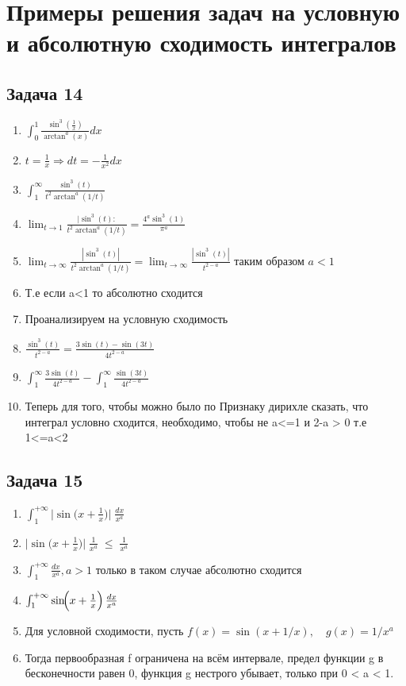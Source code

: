 \documentclass[a4paper,12pt]{article}
\begin{document}
\section{Примеры решения задач на условную и абсолютную сходимость интегралов}

\subsection{Задача 14}

\begin{enumerate}
    \item $\int_{0}^{1}\frac{\sin^3(\frac{1}{x})}{\arctan^a(x)}dx$
    \item $t = \frac{1}{x} \Rightarrow dt = -\frac{1}{x^2}dx$
    \item $\int_{1}^{\infty}\frac{\sin^3(t)}{t^2\arctan^a(1/t)}$
    \item $\lim_{t \to 1} \frac{|\sin^3(t):}{t^2\arctan^a(1/t)} = \frac{4^a\sin^3(1)}{\pi^a}$
    \item $\lim_{t \to \infty} \frac{|\sin^3(t)|}{t^2\arctan^a(1/t)} = \lim_{t \to \infty} \frac{|\sin^3(t)|}{t^{2-a}}$ таким образом $ a < 1$
    \item Т.е если a<1 то абсолютно сходится
    \item Проанализируем на условную сходимость
    \item $\frac{\sin^3(t)}{t^{2-a}} = \frac{3\sin(t)-\sin(3t)}{4t^{2-a}}$
    \item $\int_{1}^{\infty} \frac{3\sin(t)}{4t^{2-a}} - \int_{1}^{\infty} \frac{\sin(3t)}{4t^{2-a}}$
    \item Теперь для того, чтобы можно было по Признаку дирихле сказать, что интеграл условно сходится, необходимо, чтобы не a<=1 и 2-a > 0 т.е 1<=a<2
\end{enumerate}

\subsection{Задача 15}
\begin{enumerate}
    \item $\int_{1}^{+\infty} \bigl|\sin\!\bigl(x + \tfrac{1}{x}\bigr)\bigr|\;\frac{dx}{x^a}$
    \item $\bigl|\sin\!\bigl(x + \tfrac{1}{x}\bigr)\bigr|\;\frac{1}{x^a}\;\le\;\frac{1}{x^a}$ 
    \item $\int_{1}^{+\infty}\frac{dx}{x^a}, a>1$ только в таком случае абсолютно сходится
    \item $\int_{1}^{+\infty} \sin\!\Bigl(x + \tfrac{1}{x}\Bigr)\,\frac{dx}{x^a}$
    \item Для условной сходимости, пусть $f(x)=\sin(x+1/x), \quad g(x) = 1/x^a$
    \item Тогда первообразная f ограничена на всём интервале, предел функции g в бесконечности равен 0, функция g нестрого убывает, только при 0 < a < 1.
\end{enumerate}
\end{document}
